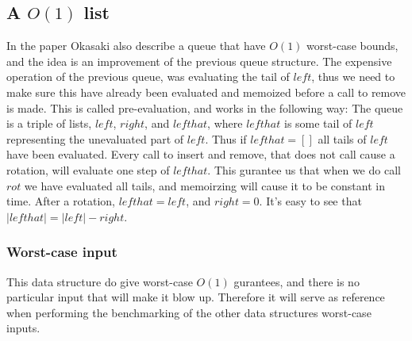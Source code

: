 \subsection*{A $O(1)$ list}
In the paper Okasaki also describe a queue that have $O(1)$ worst-case bounds, and the idea is an improvement of the previous queue structure. The expensive operation of the previous queue, was evaluating the tail of $left$, thus we need to make sure this have already been evaluated and memoized before a call to remove is made. This is called pre-evaluation, and works in the following way: The queue is a triple of lists, $left$, $right$, and $lefthat$, where $lefthat$ is some tail of $left$ representing the unevaluated part of $left$. Thus if $lefthat = []$ all tails of $left$ have been evaluated. Every call to insert and remove, that does not call cause a rotation, will evaluate one step of $lefthat$. This gurantee us that when we do call $rot$ we have evaluated all tails, and memoirzing will cause it to be constant in time. After a rotation, $lefthat = left$, and $right = 0$. It's easy to see that $|lefthat| = |left| - right$.

\subsubsection{Worst-case input}
This data structure do give worst-case $O(1)$ gurantees, and there is no particular input that will make it blow up. Therefore it will serve as reference when performing the benchmarking of the other data structures worst-case inputs.